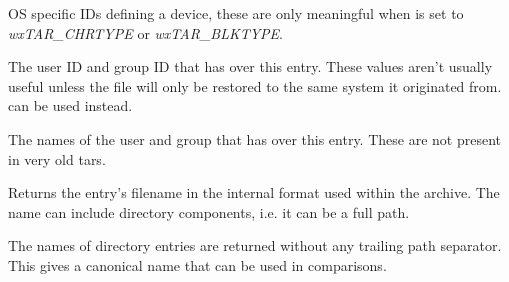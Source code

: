 


OS specific IDs defining a device, these are only meaningful when
  is set to {\it wxTAR\_CHRTYPE}
 or {\it wxTAR\_BLKTYPE}.


\label{wxtarentryuidgid}





The user ID and group ID that has  over
this entry. These values aren't usually useful unless the file will only be
restored to the same system it originated from.  can be used instead.


\label{wxtarentryunamegname}





The names of the user and group that has 
over this entry. These are not present in very old tars.


\label{wxtarentrygetinternalname}


Returns the entry's filename in the internal format used within the
archive. The name can include directory components, i.e. it can be a
full path.

The names of directory entries are returned without any trailing path
separator. This gives a canonical name that can be used in comparisons.


